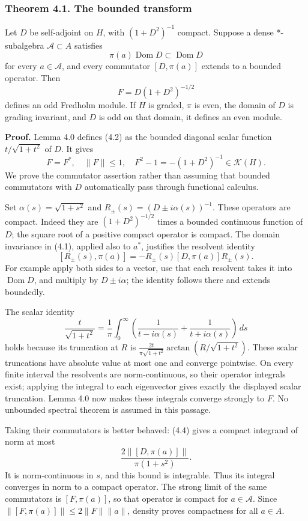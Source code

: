 \documentclass[
  11pt,
]{article}
\begin{document}
\subsubsection{Theorem 4.1. The bounded
transform}\label{theorem-4.1.-the-bounded-transform}

Let \(D\) be self-adjoint on \(H\), with \((1+D^2)^{-1}\) compact.
Suppose a dense *-subalgebra \(\mathcal A\subset A\) satisfies \[
\pi(a)\operatorname{Dom}D\subset\operatorname{Dom}D
\tag{4.1}
\] for every \(a\in\mathcal A\), and every commutator \([D,\pi(a)]\)
extends to a bounded operator. Then \[
F=D(1+D^2)^{-1/2}
\tag{4.2}
\] defines an odd Fredholm module. If \(H\) is graded, \(\pi\) is even,
the domain of \(D\) is grading invariant, and \(D\) is odd on that
domain, it defines an even module.

\textbf{Proof.} Lemma 4.0 defines (4.2) as the bounded diagonal scalar
function \(t/\sqrt{1+t^2}\) of \(D\). It gives \[
F=F^*,\quad \|F\|\leq1,\quad
F^2-1=-(1+D^2)^{-1}\in\mathcal K(H).
\tag{4.3}
\] We prove the commutator assertion rather than assuming that bounded
commutators with \(D\) automatically pass through functional calculus.

Set \(\alpha(s)=\sqrt{1+s^2}\) and \(R_\pm(s)=(D\pm i\alpha(s))^{-1}\).
These operators are compact. Indeed they are \((1+D^2)^{-1/2}\) times a
bounded continuous function of \(D\); the square root of a positive
compact operator is compact. The domain invariance in (4.1), applied
also to \(a^*\), justifies the resolvent identity \[
[R_\pm(s),\pi(a)]=-R_\pm(s)[D,\pi(a)]R_\pm(s).
\tag{4.4}
\] For example apply both sides to a vector, use that each resolvent
takes it into \(\operatorname{Dom}D\), and multiply by \(D\pm i\alpha\);
the identity follows there and extends boundedly.

The scalar identity \[
\frac{t}{\sqrt{1+t^2}}
=\frac1\pi\int_0^\infty
\left(\frac1{t-i\alpha(s)}+\frac1{t+i\alpha(s)}\right)\,ds
\tag{4.5}
\] holds because its truncation at \(R\) is
\(\frac{2t}{\pi\sqrt{1+t^2}}\arctan(R/\sqrt{1+t^2})\). These scalar
truncations have absolute value at most one and converge pointwise. On
every finite interval the resolvents are norm-continuous, so their
operator integrals exist; applying the integral to each eigenvector
gives exactly the displayed scalar truncation. Lemma 4.0 now makes these
integrals converge strongly to \(F\). No unbounded spectral theorem is
assumed in this passage.

Taking their commutators is better behaved: (4.4) gives a compact
integrand of norm at most \[
\frac{2\|[D,\pi(a)]\|}{\pi(1+s^2)}.
\] It is norm-continuous in \(s\), and this bound is integrable. Thus
its integral converges in norm to a compact operator. The strong limit
of the same commutators is \([F,\pi(a)]\), so that operator is compact
for \(a\in\mathcal A\). Since \(\|[F,\pi(a)]\|\leq2\|F\|\|a\|\), density
proves compactness for all \(a\in A\).
\end{document}
